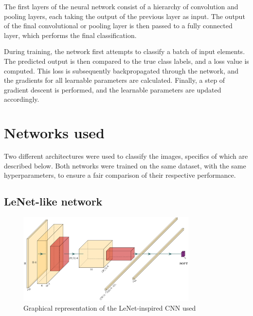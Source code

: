 \documentclass{pracalicmgr}
\begin{document}
The first layers of the neural network consist of a hierarchy of convolution and pooling layers, each taking the output of the previous layer as input. The output of the final convolutional or pooling layer is then passed to a fully connected layer, which performs the final classification.

During training, the network first attempts to classify a batch of input elements. The predicted output is then compared to the true class labels, and a loss value is computed. This loss is subsequently backpropagated through the network, and the gradients for all learnable parameters are calculated. Finally, a step of gradient descent is performed, and the learnable parameters are updated accordingly.

\section{Networks used}

Two different architectures were used to classify the images, specifics of which are described below. Both networks were trained on the same dataset, with the same hyperparameters, to ensure a fair comparison of their respective performance.

\subsection{LeNet-like network}

\begin{figure}[H]
    \centering
    \includegraphics[width=0.8\textwidth]{src/LeNetLike.pdf}
    \caption{Graphical representation of the LeNet-inspired CNN used}
    \label{fig:lenetLike_architecture}
\end{figure}
\end{document}
